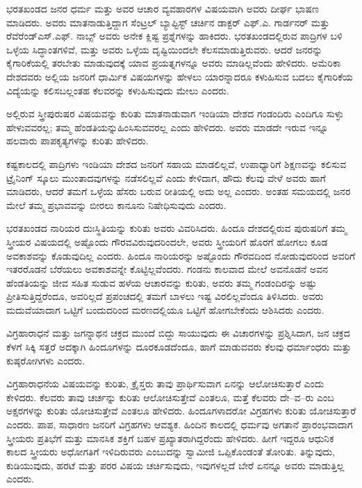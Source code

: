 ಭರತಖಂಡದ ಜನರ ಧರ್ಮ ಮತ್ತು ಅವರ ಆಚಾರ ವ್ಯವಹಾರಗಳ ವಿಷಯವಾಗಿ ಅವರು ದೀರ್ಘ ಭಾಷಣ ಮಾಡಿದರು. ಅವರು ಮಾತನಾಡುತ್ತಿದ್ದಾಗ ಸೆಂಟ್ರಲ್​ ಬ್ಯಾಪ್ಟಿಸ್ಟ್​ ಚರ್ಚಿನ ಡಾಕ್ಟರ್​ ಎಫ್​.ಎ. ಗಾರ್ಡನರ್​ ಮತ್ತು ರೆವೆರೆಂಡ್​ ಎಸ್​.ಎಫ್​. ನಾಬ್ಸ್​ ಅವರು ಅನೇಕ ಕ್ಲಿಷ್ಟ ಪ್ರಶ್ನೆಗಳನ್ನು ಹಾಕಿದರು. ಭರತಖಂಡದಲ್ಲಿರುವ ಪಾದ್ರಿಗಳ ಬಳಿ ಒಳ್ಳೆಯ ಸಿದ್ಧಾಂತಗಳಿವೆ, ಮತ್ತು ಅವರು ಒಳ್ಳೆಯ ದೃಷ್ಟಿಯಿಂದಲೇ ಕೆಲಸಮಾಡುತ್ತಿರುವರು. ಆದರೆ ಜನರನ್ನು ಕೈಗಾರಿಕೆಯಲ್ಲಿ ತರಬೇತು ಮಾಡುವುದಕ್ಕೆ ಯಾವ ಪ್ರಯತ್ನಗಳನ್ನೂ ಅವರು ಮಾಡಿಲ್ಲವೆಂದು ಹೇಳಿದರು. ಅಮೆರಿಕಾ ದೇಶದವರು ಅಲ್ಲಿಯ ಜನರಿಗೆ ಧಾರ್ಮಿಕ ವಿಷಯಗಳನ್ನು ಹೇಳಲು ಯಾರನ್ನಾದರೂ ಕಳುಹಿಸುವ ಬದಲು ಕೈಗಾರಿಕೆಯ ವಿದ್ಯೆಯನ್ನು ಕಲಿಸಬಲ್ಲಂತಹ ಕೆಲವರನ್ನು ಕಳುಹಿಸುವುದು ಮೇಲು ಎಂದರು.

ಅಲ್ಲಿರುವ ಸ್ತ್ರೀಪುರುಷರ ವಿಷಯವನ್ನು ಕುರಿತು ಮಾತನಾಡುವಾಗ ಇಂಡಿಯಾ ದೇಶದ ಗಂಡಂದಿರು ಎಂದಿಗೂ ಸುಳ್ಳು ಹೇಳುವವರಲ್ಲ; ತಮ್ಮ ಹೆಂಡತಿಯನ್ನು\break ಹಿಂಸಿಸುವವರಲ್ಲ ಎಂದು ಹೇಳಿದರು. ಅವರು ಮಾಡದೇ ಇರುವ ಇನ್ನೂ ಹಲವಾರು ಪಾಪಕೃತ್ಯಗಳನ್ನು ಕುರಿತು ಹೇಳಿದರು.

ಕಷ್ಟಕಾಲದಲ್ಲಿ ಪಾದ್ರಿಗಳು ಇಂಡಿಯಾ ದೇಶದ ಜನರಿಗೆ ಸಹಾಯ ಮಾಡಲಿಲ್ಲವೆ, ಉಪಾಧ್ಯಾರಿಗೆ ಶಿಕ್ಷಣವನ್ನು ಕಲಿಸುವ ಟ್ರೈನಿಂಗ್​ ಸ್ಕೂಲು ಮುಂತಾದವುಗಳನ್ನು ನಡೆಸ\break ಲಿಲ್ಲವೆ ಎಂದು ಕೇಳಿದಾಗ, ಹೌದು ಕೆಲವು ವೇಳೆ ಅವರು ಹಾಗೆ ಮಾಡಿದರು, ಆದರೆ ತಮಗೆ ಒಳ್ಳೆಯ ಹೆಸರು ಬರುವ ರೀತಿಯಲ್ಲಿ ಅದು ಅಲ್ಲ ಎಂದರು. ಅಂತಹ ಸಮಯದಲ್ಲಿ ಜನರ ಮೇಲೆ ತಮ್ಮ ಪ್ರಭಾವವನ್ನು ಬೀರಲು ಕಾನೂನು ನಿಷೇಧಿಸುವುದು ಎಂದರು.

ಭರತಖಂಡದ ನಾರಿಯರ ದುಃಸ್ಥಿತಿಯನ್ನು ಕುರಿತು ಅವರು ವಿವರಿಸಿದರು. ಹಿಂದೂ ದೇಶದಲ್ಲಿರುವ ಪುರುಷರಿಗೆ ತಮ್ಮ ಸ್ತ್ರೀಯರ ವಿಷಯದಲ್ಲಿ ಅಷ್ಟೊಂದು ಗೌರವವಿರುವುದ\break ರಿಂದಲೇ, ಅವರು ಸ್ತ್ರೀಯರಿಗೆ ಹೊರಗೆ ಹೋಗಲು ಕೂಡ ಅವಕಾಶವನ್ನು ಕೊಡುವುದಿಲ್ಲ ಎಂದರು. ಹಿಂದೂ ನಾರಿಯರನ್ನು ಅಷ್ಟೊಂದು ಗೌರವದಿಂದ ನೋಡುವುದರಿಂದ ಅವರಿಗೆ ಇತರರೊಡನೆ ಬೆರೆಯಲು ಅವಕಾಶವನ್ನೇ ಕೊಟ್ಟಿಲ್ಲವೆಂದರು. ಗಂಡನು ಕಾಲವಾದ ಮೇಲೆ ಅವನೊಡನೆ ಅವನ ಹೆಂಡತಿಯನ್ನು ಜೀವ ಸಹಿತ ಸುಡುವ ಹಳೆಯ ಆಚಾರವನ್ನು ಕುರಿತು, ಅವರು ತಮ್ಮ ಗಂಡಂದಿರನ್ನು ಅಷ್ಟು ಪ್ರೀತಿಸುತ್ತಿದ್ದರೆಂದೂ, ಅವರಿಲ್ಲದೆ ಪ್ರಪಂಚದಲ್ಲಿ ತಮಗೆ ಬಾಳಲು ಇಷ್ಟ ವಿರಲಿಲ್ಲವೆಂದೂ ತಿಳಿಸಿದರು. ಅವರು ಮದುವೆಯಾದಾಗ ಒಟ್ಟಿಗೆ ಬಂದುದರಿಂದ ಮರಣದಲ್ಲಿಯೂ ಒಟ್ಟಿಗೆ ಹೋಗಬೇಕೆಂದು ಆಶಿಸಿದರು ಎಂದರು.

ವಿಗ್ರಹಾರಾಧನೆ ಮತ್ತು ಜಗನ್ನಾಥನ ಚಕ್ರದ ಮುಂದೆ ಬಿದ್ದು ಸಾಯುವುದು ಈ ವಿಚಾರಗಳನ್ನು ಪ್ರಶ್ನಿಸಿದಾಗ, ಜನ ಚಕ್ರದ ಕೆಳಗೆ ಸಿಕ್ಕಿ ಸತ್ತರೆ ಅದಕ್ಕಾಗಿ ಹಿಂದೂಗಳನ್ನು ದೂರಕೂಡದೆಂದೂ, ಹಾಗೆ ಮಾಡುವವರು ಕೆಲವು ಧರ್ಮಾಂಧರು ಮತ್ತು ಕುಷ್ಠರೋಗಿಗಳು ಎಂದರು.

ವಿಗ್ರಹಾರಾಧನೆಯ ವಿಷಯವನ್ನು ಕುರಿತು, ಕ್ರೈಸ್ತರು ತಾವು ಪ್ರಾರ್ಥಿಸುವಾಗ ಏನನ್ನು ಆಲೋಚಿಸುತ್ತಾರೆ ಎಂದು ಕೇಳಿದರು. ಕೆಲವರು ತಾವು ಚರ್ಚನ್ನು ಕುರಿತು ಆಲೋಚಿಸುತ್ತೇವೆ ಎಂತಲೂ, ಮತ್ತೆ ಕೆಲವರು ದೇ–ವ–ರು ಎಂಬ ಅಕ್ಷರಗಳನ್ನು ಕುರಿತು ಯೋಚಿಸುತ್ತೇವೆ ಎಂತಲೂ ಹೇಳಿದರು. ಹಿಂದೂಗಳಾದರೋ ವಿಗ್ರಹಗಳು ಕುರಿತು ಯೋಚಿಸುತ್ತಾರೆ ಎಂದರು. ಪಾಪ, ಸಾಧಾರಣ ಜನರಿಗೆ ವಿಗ್ರಹಗಳು ಆವಶ್ಯಕ. ಹಿಂದಿನ ಕಾಲದಲ್ಲಿ ಧರ್ಮವು ಅಗತಾನೆ ಪ್ರಾರಂಭವಾದಾಗ ಸ್ತ್ರೀಯರು ಪ್ರತಿಭೆಗೆ ಮತ್ತು ಮಾನಸಿಕ ಶಕ್ತಿಗೆ ಬಹಳ ಪ್ರಖ್ಯಾತರಾಗಿದ್ದರೆಂದು ಹೇಳಿದರು. ಹೀಗೆ ಇದ್ದರೂ ಆಧುನಿಕ ಕಾಲದ ಸ್ತ್ರೀಯರು ಅಧೋಗತಿಗೆ ಇಳಿದಿರುವರು ಎಂಬುದನ್ನು ಸ್ವಾಮೀಜಿ ಒಪ್ಪಿಕೊಂಡಂತೆ ತೋರಿತು. ತಿನ್ನುವುದು, ಕುಡಿಯುವುದು, ಹರಟೆ ಮತ್ತು ಪರರ ವಿಷಯ ಚರ್ಚಿಸುವುದು, ಇವುಗಳಲ್ಲದೆ ಬೇರೆ ಏನನ್ನೂ ಅವರು ಮಾಡುತ್ತಿಲ್ಲ ಎಂದರು.

